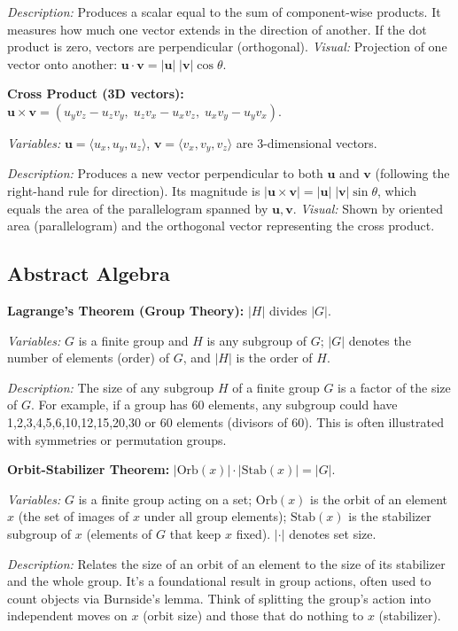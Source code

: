 \documentclass{article}
\begin{document}
\textit{Description:} Produces a scalar equal to the sum of component-wise products. It measures how much one vector extends in the direction of another. If the dot product is zero, vectors are perpendicular (orthogonal). \textit{Visual:} Projection of one vector onto another: $\mathbf{u}\cdot \mathbf{v} = |\mathbf{u}|\;|\mathbf{v}|\cos\theta$.

\textbf{Cross Product (3D vectors):} $\mathbf{u} \times \mathbf{v} = (u_y v_z - u_z v_y,\; u_z v_x - u_x v_z,\; u_x v_y - u_y v_x)$.

\textit{Variables:} $\mathbf{u}=\langle u_x,u_y,u_z\rangle$, $\mathbf{v}=\langle v_x,v_y,v_z\rangle$ are 3-dimensional vectors.

\textit{Description:} Produces a new vector perpendicular to both $\mathbf{u}$ and $\mathbf{v}$ (following the right-hand rule for direction). Its magnitude is $|\mathbf{u}\times \mathbf{v}| = |\mathbf{u}|\;|\mathbf{v}|\sin\theta$, which equals the area of the parallelogram spanned by $\mathbf{u}, \mathbf{v}$. \textit{Visual:} Shown by oriented area (parallelogram) and the orthogonal vector representing the cross product.

\subsection*{Abstract Algebra}

\textbf{Lagrange’s Theorem (Group Theory):} $|H|$ divides $|G|$.

\textit{Variables:} $G$ is a finite group and $H$ is any subgroup of $G$; $|G|$ denotes the number of elements (order) of $G$, and $|H|$ is the order of $H$.

\textit{Description:} The size of any subgroup $H$ of a finite group $G$ is a factor of the size of $G$. For example, if a group has 60 elements, any subgroup could have 1,2,3,4,5,6,10,12,15,20,30 or 60 elements (divisors of 60). This is often illustrated with symmetries or permutation groups.

\textbf{Orbit-Stabilizer Theorem:} $|\mathrm{Orb}(x)| \cdot |\mathrm{Stab}(x)| = |G|$.

\textit{Variables:} $G$ is a finite group acting on a set; $\mathrm{Orb}(x)$ is the orbit of an element $x$ (the set of images of $x$ under all group elements); $\mathrm{Stab}(x)$ is the stabilizer subgroup of $x$ (elements of $G$ that keep $x$ fixed). $|\cdot|$ denotes set size.

\textit{Description:} Relates the size of an orbit of an element to the size of its stabilizer and the whole group. It’s a foundational result in group actions, often used to count objects via Burnside’s lemma. Think of splitting the group's action into independent moves on $x$ (orbit size) and those that do nothing to $x$ (stabilizer).
\end{document}
